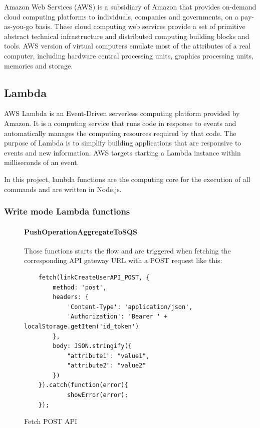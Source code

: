 Amazon Web Services (AWS) is a subsidiary of Amazon that provides on-demand cloud computing platforms to individuals, companies and governments, on a pay-as-you-go basis. These cloud computing web services provide a set of primitive abstract technical infrastructure and distributed computing building blocks and tools. AWS version of virtual computers emulate most of the attributes of a real computer, including hardware central processing units, graphics processing units, memories and storage.

\subsection{Lambda}
AWS Lambda is an Event-Driven serverless computing platform provided by Amazon. It is a computing service that runs code in response to events and automatically manages the computing resources required by that code. The purpose of Lambda is to simplify building applications that are responsive to events and new information. AWS targets starting a Lambda instance within milliseconds of an event.

In this project, lambda functions are the computing core for the execution of all commands and are written in Node.js.

\subsubsection{Write mode Lambda functions}
\begin{figure} [H]
\paragraph{PushOperationAggregateToSQS} \Spazio
Those functions starts the flow and are triggered when fetching the corresponding API gateway URL with a POST request like this: \\
\begin{lstlisting}
	fetch(linkCreateUserAPI_POST, {
		method: 'post',
		headers: {
			'Content-Type': 'application/json',
			'Authorization': 'Bearer ' + localStorage.getItem('id_token')
		},	
		body: JSON.stringify({
			"attribute1": "value1",
			"attribute2": "value2" 
		})
	}).catch(function(error){
			showError(error);
	});
\end{lstlisting}
	\caption{Fetch POST API}\label{}
\end{figure}

